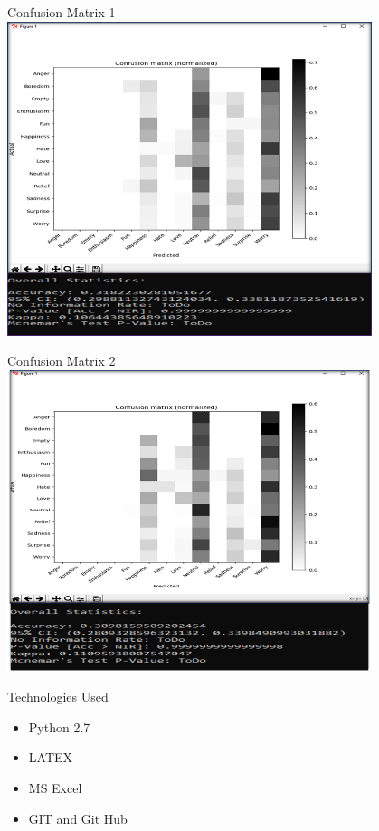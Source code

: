 \documentclass{beamer}
\begin{document}
\begin{frame}{Confusion Matrix 1}
\centering
    \includegraphics[width=0.8\textwidth]{Confusion1.png}
  
\end{frame}
\begin{frame}{Confusion Matrix 2}
     \centering
    \includegraphics[width=0.8\textwidth]{Confusion2.png}
    \caption{}
    \end{frame}
\begin{frame}{Technologies Used}
     \beginleft
     \begin{enumerate}
     \begin{itemize}
         \item Python 2.7
         \item LATEX
    \item MS Excel
    \item GIT and Git Hub
     \end{itemize}
        \end{enumerate}
       \endleft
     \end{frame} 
\end{document}
